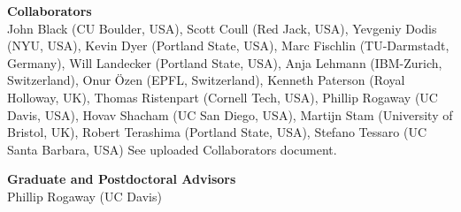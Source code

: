 \documentclass{article}[11pt]
\newcommand{\drop}{\protect{\vspace{1.2ex}}}
\begin{document}
\begin{noindent}
{{\bf Collaborators}\\
John Black (CU Boulder, USA),
Scott Coull (Red Jack, USA),
Yevgeniy Dodis (NYU, USA),
Kevin Dyer (Portland State, USA),
Marc Fischlin (TU-Darmstadt, Germany),
Will Landecker (Portland State, USA),
Anja Lehmann (IBM-Zurich, Switzerland),
Onur \"{O}zen (EPFL, Switzerland),
Kenneth Paterson (Royal Holloway, UK),
Thomas Ristenpart (Cornell Tech, USA),
Phillip Rogaway (UC Davis, USA),
Hovav Shacham (UC San Diego, USA),
Martijn Stam (University of Bristol, UK),
Robert Terashima (Portland State, USA),
Stefano Tessaro (UC Santa Barbara, USA)
\fi
See uploaded Collaborators document.

\drop
{\bf Graduate and Postdoctoral Advisors}\\
Phillip Rogaway (UC Davis)
}


\end{noindent}
\end{document}

